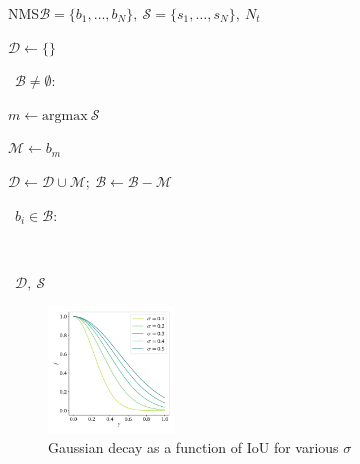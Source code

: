 \begin{samepage}
\begin{pseudofunc}{NMS}{\(\mathcal{B}=\{b_1,\ldots,b_N \},~\mathcal{S}=\{s_1,\ldots,s_N \},~N_t\)}
  \item \(\mathcal{D} \leftarrow \{ \} \)
  \item \pwhile~\(\mathcal{B} \neq \emptyset \):
  \begin{pseudoloop}
    \item \(m \leftarrow \text{argmax}~\mathcal{S}\)
    \item \(\mathcal{M} \leftarrow b_m\)
    \item \(\mathcal{D} \leftarrow \mathcal{D} \cup \mathcal{M};~ \mathcal{B} \leftarrow \mathcal{B} - \mathcal{M}\)
    \item \pfor~\(b_i \in \mathcal{B}\):
    \vspace{6pt}
    \begin{pseudoloop}
      \vspace{5pt}\\
    \end{pseudoloop}
  \end{pseudoloop}\vspace{5pt}
  \item \pret~\(\mathcal{D},~\mathcal{S}\)
\end{pseudofunc}
\end{samepage}

\begin{figure}
  \centering
  \includegraphics[width=0.3\textwidth]{figs/method/gausian_penelty.pdf}
  \caption{Gaussian decay as a function of IoU for various \( \sigma \)}\label{fig:gauss}
\end{figure}


